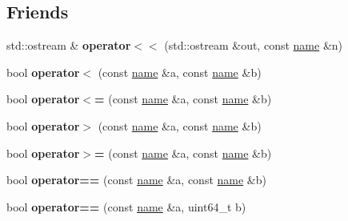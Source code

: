\subsection*{Friends}
\begin{DoxyCompactItemize}
\item 
\mbox{\label{structaacio_1_1chain_1_1name_a88dca791bea36ed8ca751b98b770c4c8}} 
std\+::ostream \& {\bfseries operator$<$$<$} (std\+::ostream \&out, const \mbox{\hyperlink{structaacio_1_1chain_1_1name}{name}} \&n)
\item 
\mbox{\label{structaacio_1_1chain_1_1name_a2700690ae6cab1a8b38d1525cf6d1155}} 
bool {\bfseries operator$<$} (const \mbox{\hyperlink{structaacio_1_1chain_1_1name}{name}} \&a, const \mbox{\hyperlink{structaacio_1_1chain_1_1name}{name}} \&b)
\item 
\mbox{\label{structaacio_1_1chain_1_1name_a1d5239275cfa4958df2a7a66b1f8d5b2}} 
bool {\bfseries operator$<$=} (const \mbox{\hyperlink{structaacio_1_1chain_1_1name}{name}} \&a, const \mbox{\hyperlink{structaacio_1_1chain_1_1name}{name}} \&b)
\item 
\mbox{\label{structaacio_1_1chain_1_1name_adac2f8a87533be586422f90377530dc6}} 
bool {\bfseries operator$>$} (const \mbox{\hyperlink{structaacio_1_1chain_1_1name}{name}} \&a, const \mbox{\hyperlink{structaacio_1_1chain_1_1name}{name}} \&b)
\item 
\mbox{\label{structaacio_1_1chain_1_1name_a89b3d76b4c33872d5ff47016ee240920}} 
bool {\bfseries operator$>$=} (const \mbox{\hyperlink{structaacio_1_1chain_1_1name}{name}} \&a, const \mbox{\hyperlink{structaacio_1_1chain_1_1name}{name}} \&b)
\item 
\mbox{\label{structaacio_1_1chain_1_1name_ab35bfaf393e498e39ffe3e280c4c90bf}} 
bool {\bfseries operator==} (const \mbox{\hyperlink{structaacio_1_1chain_1_1name}{name}} \&a, const \mbox{\hyperlink{structaacio_1_1chain_1_1name}{name}} \&b)
\item 
\mbox{\label{structaacio_1_1chain_1_1name_aefc76f37195f16336c51572b58410fab}} 
bool {\bfseries operator==} (const \mbox{\hyperlink{structaacio_1_1chain_1_1name}{name}} \&a, uint64\+\_\+t b)

\end{DoxyCompactItemize}
